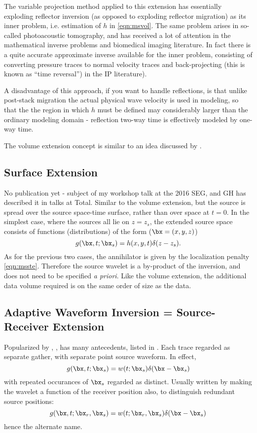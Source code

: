 The variable projection method applied to this extension has essentially exploding reflector inversion (as opposed to exploding reflector migration) as its inner problem, i.e. estimation of $h$ in \ref{eqn:msvol}. The same problem arises in so-called photoacoustic tomography, and has received a lot of attention in the mathematical inverse problems and biomedical imaging literature. In fact there is a quite accurate approximate inverse available for the inner problem, consisting of converting pressure traces to normal velocity traces and back-projecting (this is known as ``time reversal'') in the IP literature).

A disadvantage of this approach, if you want to handle reflections, is that unlike post-stack migration the actual physical wave velocity is used in modeling, so that the the region in which $h$ must be defined may considerably larger than the ordinary modeling domain - reflection two-way time is effectively modeled by one-way time.

The volume extension concept is similar to an idea discussed by \cite{ZhangGao:08}.

\subsection{Surface Extension}
No publication yet - subject of my workshop talk at the 2016 SEG, and GH has described it in talks at Total. Similar to the volume extension, but the source is spread over the source space-time surface, rather than over space at $t=0$. In the simplest case, where the sources all lie on $z=z_s$, the extended source space consists of functions (distributions) of the form ($\bx=(x,y,z)$)
\begin{equation}
\label{eqn:mssur}
g(\bx,t;\bx_s) = h(x,y,t)\delta(z-z_s).
\end{equation}
As for the previous two cases, the annihilator is given by the localization penalty \ref{eqn:msste}. Therefore the source wavelet is a by-product of the inversion, and does not need to be specified {\em a priori}. Like the volume extension, the additional data volume required is on the same order of size as the data.

\subsection{Adaptive Waveform Inversion = Source-Receiver Extension}
 Popularized by \cite{Warner:14}, \cite{Warner:16}, has many antecedents, listed in \cite[]{HuangSymes:17}. Each trace regarded as separate gather, with separate point source waveform. In effect,
\begin{equation}
\label{eqn:awi}
g(\bx,t;\bx_s) = w(t;\bx_s)\delta(\bx-\bx_s) 
\end{equation}
with repeated occurances of $\bx_s$ regarded as distinct. Usually written by making the wavelet a function of the receiver position also, to distinguish redundant source positions:
\begin{equation}
\label{eqn:awi-alt}
g(\bx,t;\bx_r,\bx_s) = w(t;\bx_r,\bx_s)\delta(\bx-\bx_s) 
\end{equation}
hence the alternate name.

